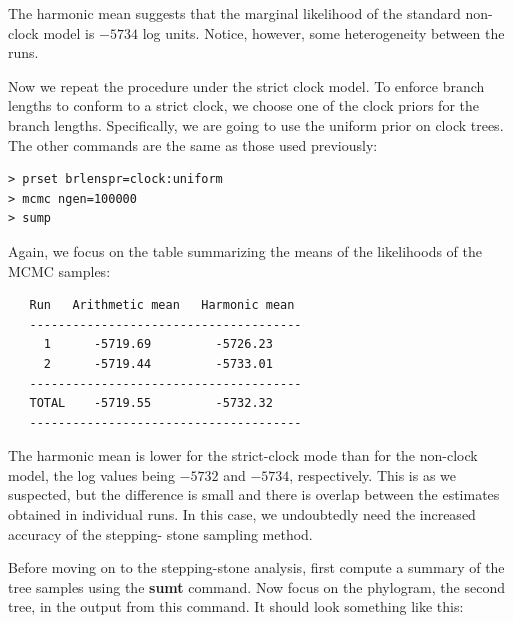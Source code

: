 \documentclass[12pt]{book}
\begin{document}
The harmonic mean suggests that the marginal likelihood of the standard non-clock model is $-5734$
log units. Notice, however, some heterogeneity between the runs.

Now we repeat the procedure under the strict clock model. To enforce branch lengths to conform to a
strict clock, we choose one of the clock priors for the branch lengths. Specifically, we are going
to use the uniform prior on clock trees.  The other commands are the same as those used previously:

\begin{singlespacing}
\begin{verbatim}
> prset brlenspr=clock:uniform
> mcmc ngen=100000
> sump
\end{verbatim}
\end{singlespacing}

Again, we focus on the table summarizing the means of the likelihoods of the MCMC samples:

\begin{singlespacing}
\begin{verbatim}
   Run   Arithmetic mean   Harmonic mean
   --------------------------------------
     1      -5719.69         -5726.23
     2      -5719.44         -5733.01
   --------------------------------------
   TOTAL    -5719.55         -5732.32
   --------------------------------------
\end{verbatim}
\end{singlespacing}

The harmonic mean is lower for the strict-clock mode than for the non-clock model, the log values
being $-5732$ and $-5734$, respectively. This is as we suspected, but the difference is small and
there is overlap between the estimates obtained in individual runs. In this case, we undoubtedly
need the increased accuracy of the stepping- stone sampling method.

Before moving on to the stepping-stone analysis, first compute a summary of the tree samples using
the \textbf{sumt} command. Now focus on the phylogram, the second tree, in the output from this
command. It should look something like this:
\end{document}
